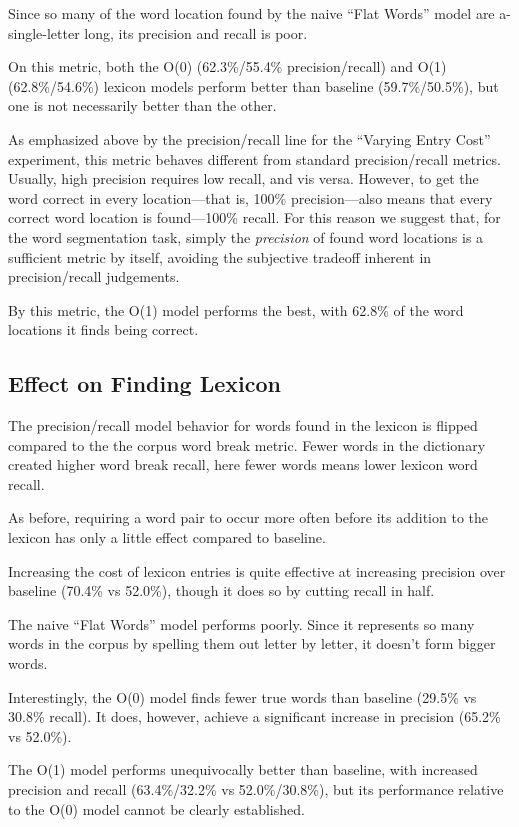 \documentclass[11pt, oneside, fleqn]{article}
\begin{document}
	Since so many of the word location found by the naive ``Flat Words'' model are a-single-letter long, its precision and recall is poor.

	On this metric, both the O(0) (62.3\%/55.4\% precision/recall) and O(1) (62.8\%/54.6\%) lexicon models perform better than baseline (59.7\%/50.5\%), but one is not necessarily better than the other.


	As emphasized above by the precision/recall line for the ``Varying Entry Cost'' experiment, this metric behaves different from standard precision/recall metrics. Usually, high precision requires low recall, and vis versa. However, to get the word correct in every location---that is, 100\% precision---also means that every correct word location is found---100\% recall. For this reason we suggest that, for the word segmentation task, simply the \textit{precision} of found word locations is a sufficient metric by itself, avoiding the subjective tradeoff inherent in precision/recall judgements.
	
	By this metric, the O(1) model performs the best, with 62.8\% of the word locations it finds being correct.

  \subsection{Effect on Finding Lexicon}

	The precision/recall model behavior for words found in the lexicon is flipped compared to the the corpus word break metric. Fewer words in the dictionary created higher word break recall, here fewer words means lower lexicon word recall.

	As before, requiring a word pair to occur more often before its addition to the lexicon has only a little effect compared to baseline.

	Increasing the cost of lexicon entries is quite effective at increasing precision over baseline (70.4\% vs 52.0\%), though it does so by cutting recall in half.

	The naive ``Flat Words'' model performs poorly. Since it represents so many words in the corpus by spelling them out letter by letter, it doesn't form bigger words.

	Interestingly, the O(0) model finds fewer true words than baseline (29.5\% vs 30.8\% recall). It does, however, achieve a significant increase in precision (65.2\% vs 52.0\%).

	The O(1) model performs unequivocally better than baseline, with increased precision and recall (63.4\%/32.2\% vs 52.0\%/30.8\%), but its performance relative to the O(0) model cannot be clearly established.
\end{document}
